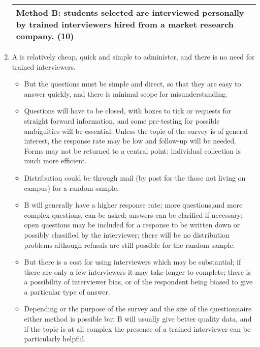 \documentclass[a4paper,12pt]{article}
\begin{document}
\begin{enumerate}
\begin{table}[ht!]
\begin{tabular}{|p{15cm}|}
 Method B:  students selected are interviewed personally by trained interviewers hired from a market research company. (10)\\ \hline
  \end{tabular}
\end{table}
\item A is relatively cheap, quick and simple to administer, and there is no need for trained
interviewers.
\begin{itemize}
    \item But the questions must be simple and direct, so that they are easy to answer quickly,
and there is minimal scope for misunderstanding.
\item Questions will have to be closed,
with boxes to tick or requests for straight forward information, and some pre-testing for
possible ambiguities will be essential. Unless the topic of the survey is of general interest,
the response rate may be low and follow-up will be needed. Forms may not be returned
to a central point: individual collection is much more efficient. \item Distribution could be
through mail (by post for the those not living on campus) for a random sample.
\item B will generally have a higher response rate; more questions,and more complex questions,
can be asked; answers can be clarified if necessary; open questions may be included for
a response to be written down or possibly classified by the interviewer; there will be no
distribution problems although refusals are still possible for the random sample.
\item But
there is a cost for using interviewers which may be substantial; if there are only a few
interviewers it may take longer to complete; there is a possibility of interviewer bias, or
of the respondent being biased to give a particular type of answer.
\item Depending or the purpose of the survey and the size of the questionnaire either method
is possible but B will usually give better quality data, and if the topic is at all complex
the presence of a trained interviewer can be particularly helpful.
\end{itemize}


\end{enumerate}
\end{document}
